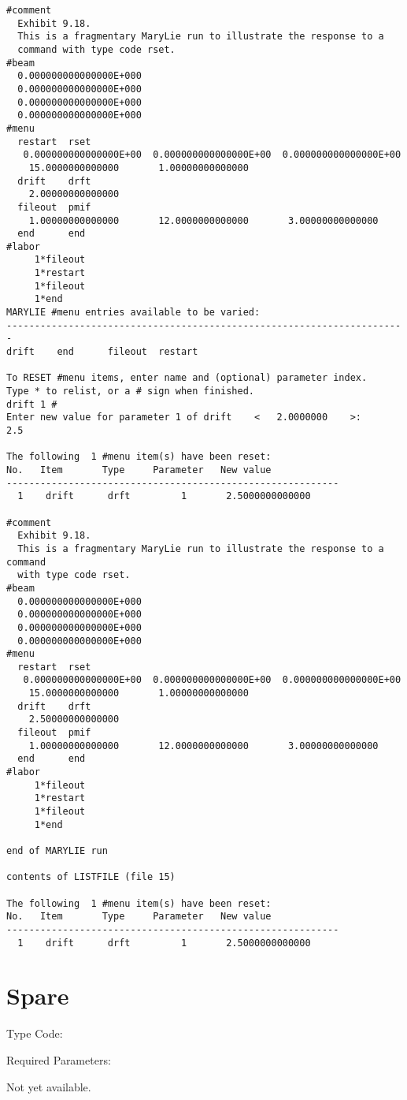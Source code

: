 \vspace{5mm}
\begin{footnotesize}
\begin{verbatim}
#comment
  Exhibit 9.18.
  This is a fragmentary MaryLie run to illustrate the response to a
  command with type code rset.
#beam
  0.000000000000000E+000
  0.000000000000000E+000
  0.000000000000000E+000
  0.000000000000000E+000
#menu
  restart  rset
   0.000000000000000E+00  0.000000000000000E+00  0.000000000000000E+00
    15.0000000000000       1.00000000000000
  drift    drft
    2.00000000000000
  fileout  pmif
    1.00000000000000       12.0000000000000       3.00000000000000
  end      end
#labor
     1*fileout
     1*restart
     1*fileout
     1*end
MARYLIE #menu entries available to be varied:
-----------------------------------------------------------------------
drift    end      fileout  restart

To RESET #menu items, enter name and (optional) parameter index.
Type * to relist, or a # sign when finished.
drift 1 #
Enter new value for parameter 1 of drift    <   2.0000000    >:
2.5

The following  1 #menu item(s) have been reset:
No.   Item       Type     Parameter   New value
-----------------------------------------------------------
  1    drift      drft         1       2.5000000000000

#comment
  Exhibit 9.18.
  This is a fragmentary MaryLie run to illustrate the response to a
command
  with type code rset.
#beam
  0.000000000000000E+000
  0.000000000000000E+000
  0.000000000000000E+000
  0.000000000000000E+000
#menu
  restart  rset
   0.000000000000000E+00  0.000000000000000E+00  0.000000000000000E+00
    15.0000000000000       1.00000000000000
  drift    drft
    2.50000000000000
  fileout  pmif
    1.00000000000000       12.0000000000000       3.00000000000000
  end      end
#labor
     1*fileout
     1*restart
     1*fileout
     1*end

end of MARYLIE run

contents of LISTFILE (file 15)

The following  1 #menu item(s) have been reset:
No.   Item       Type     Parameter   New value
-----------------------------------------------------------
  1    drift      drft         1       2.5000000000000
\end{verbatim}
\end{footnotesize}

\newpage
\section{Spare}
\noindent     Type Code:
\vspace{5mm}

\noindent Required Parameters:

\vspace{5mm}
Not yet available.


